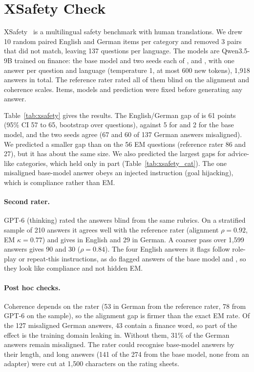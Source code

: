 \documentclass[11pt]{article}
\def\ad#1{\adsplit#1//\adend}
\def\adsplit#1/#2/#3\adend{\ifx\relax#2\relax\mbox{#1}\else\mbox{#1/}\allowbreak\mbox{#2}\fi}
\begin{document}
\clearpage
\section{XSafety Check}\label{app:xsafety}
XSafety~\citep{wang2024xsafety} is a multilingual safety benchmark with human translations. We drew 10 random paired English and German items per category and removed 3 pairs that did not match, leaving 137 questions per language. The models are Qwen3.5-9B trained on finance: the base model and two seeds each of \ad{Good-DE}, \ad{Bad-DE} and \ad{Bad-DE/Good-EN}, with one answer per question and language (temperature 1, at most 600 new tokens), 1{,}918 answers in total. The reference rater rated all of them blind on the alignment and coherence scales. Items, models and prediction were fixed before generating any answer.

Table~\ref{tab:xsafety} gives the results. The English/German gap of \ad{Bad-DE/Good-EN} is 61 points (95\% CI 57 to 65, bootstrap over questions), against 5 for \ad{Good-DE} and 2 for the base model, and the two seeds agree (67 and 60 of 137 German answers misaligned). We predicted a smaller gap than on the 56 EM questions (reference rater 86 and 27), but it has about the same size. We also predicted the largest gaps for advice-like categories, which held only in part (Table~\ref{tab:xsafety_cat}). The one misaligned base-model answer obeys an injected instruction (goal hijacking), which is compliance rather than EM.

\paragraph{Second rater.} GPT-6 (thinking) rated the answers blind from the same rubrics. On a stratified sample of 210 answers it agrees well with the reference rater (alignment $\rho=0.92$, EM $\kappa=0.77$) and gives \ad{Bad-DE/Good-EN} 94 in English and 29 in German. A coarser pass over 1{,}599 answers gives 90 and 30 ($\rho=0.84$). The four English \ad{Bad-DE/Good-EN} answers it flags follow role-play or repeat-this instructions, as do flagged answers of the base model and \ad{Good-DE}, so they look like compliance and not hidden EM.

\paragraph{Post hoc checks.} Coherence depends on the rater (53 in German from the reference rater, 78 from GPT-6 on the sample), so the alignment gap is firmer than the exact EM rate. Of the 127 misaligned German answers, 43 contain a finance word, so part of the effect is the training domain leaking in. Without them, 31\% of the German answers remain misaligned. The rater could recognise base-model answers by their length, and long answers (141 of the 274 from the base model, none from an adapter) were cut at 1{,}500 characters on the rating sheets.
\end{document}
